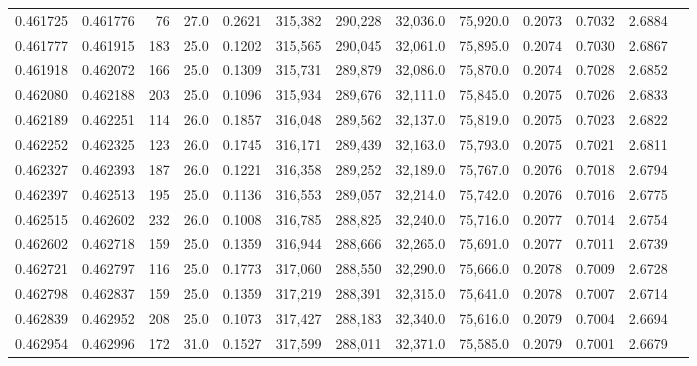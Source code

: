 \begin{tabular}{rrrrrrrrrrrrr}
0.461725 & 0.461776 &    76 & 27.0 &                                     0.2621 & 315,382 & 290,228 &  32,036.0 &  75,920.0 & 0.2073 & 0.7032 & 2.6884 \\
0.461777 & 0.461915 &   183 & 25.0 &                                     0.1202 & 315,565 & 290,045 &  32,061.0 &  75,895.0 & 0.2074 & 0.7030 & 2.6867 \\
0.461918 & 0.462072 &   166 & 25.0 &                                     0.1309 & 315,731 & 289,879 &  32,086.0 &  75,870.0 & 0.2074 & 0.7028 & 2.6852 \\
0.462080 & 0.462188 &   203 & 25.0 &                                     0.1096 & 315,934 & 289,676 &  32,111.0 &  75,845.0 & 0.2075 & 0.7026 & 2.6833 \\
0.462189 & 0.462251 &   114 & 26.0 &                                     0.1857 & 316,048 & 289,562 &  32,137.0 &  75,819.0 & 0.2075 & 0.7023 & 2.6822 \\
0.462252 & 0.462325 &   123 & 26.0 &                                     0.1745 & 316,171 & 289,439 &  32,163.0 &  75,793.0 & 0.2075 & 0.7021 & 2.6811 \\
0.462327 & 0.462393 &   187 & 26.0 &                                     0.1221 & 316,358 & 289,252 &  32,189.0 &  75,767.0 & 0.2076 & 0.7018 & 2.6794 \\
0.462397 & 0.462513 &   195 & 25.0 &                                     0.1136 & 316,553 & 289,057 &  32,214.0 &  75,742.0 & 0.2076 & 0.7016 & 2.6775 \\
0.462515 & 0.462602 &   232 & 26.0 &                                     0.1008 & 316,785 & 288,825 &  32,240.0 &  75,716.0 & 0.2077 & 0.7014 & 2.6754 \\
0.462602 & 0.462718 &   159 & 25.0 &                                     0.1359 & 316,944 & 288,666 &  32,265.0 &  75,691.0 & 0.2077 & 0.7011 & 2.6739 \\
0.462721 & 0.462797 &   116 & 25.0 &                                     0.1773 & 317,060 & 288,550 &  32,290.0 &  75,666.0 & 0.2078 & 0.7009 & 2.6728 \\
0.462798 & 0.462837 &   159 & 25.0 &                                     0.1359 & 317,219 & 288,391 &  32,315.0 &  75,641.0 & 0.2078 & 0.7007 & 2.6714 \\
0.462839 & 0.462952 &   208 & 25.0 &                                     0.1073 & 317,427 & 288,183 &  32,340.0 &  75,616.0 & 0.2079 & 0.7004 & 2.6694 \\
0.462954 & 0.462996 &   172 & 31.0 &                                     0.1527 & 317,599 & 288,011 &  32,371.0 &  75,585.0 & 0.2079 & 0.7001 & 2.6679 \\

\end{tabular}
